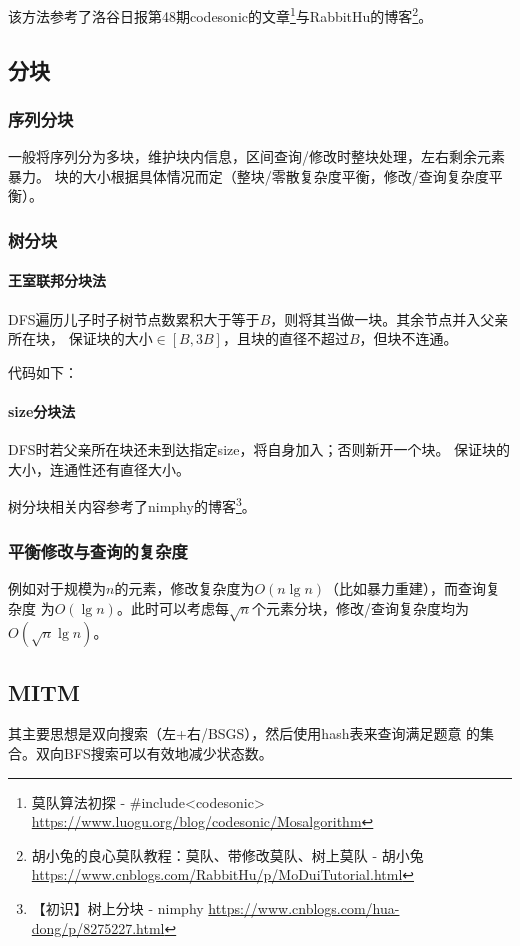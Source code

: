 该方法参考了洛谷日报第48期codesonic的文章\footnote{
	莫队算法初探 - \#include<codesonic>\\
	\url{https://www.luogu.org/blog/codesonic/Mosalgorithm}
}与RabbitHu的博客\footnote{
	胡小兔的良心莫队教程：莫队、带修改莫队、树上莫队 - 胡小兔
	\url{https://www.cnblogs.com/RabbitHu/p/MoDuiTutorial.html}
}。
\subsection{分块}\label{dividing}
\subsubsection{序列分块}
一般将序列分为多块，维护块内信息，区间查询/修改时整块处理，左右剩余元素暴力。
块的大小根据具体情况而定（整块/零散复杂度平衡，修改/查询复杂度平衡）。
\subsubsection{树分块}
\paragraph{王室联邦分块法}
DFS遍历儿子时子树节点数累积大于等于$B$，则将其当做一块。其余节点并入父亲所在块，
保证块的大小$\in [B,3B]$，且块的直径不超过$B$，但块不连通。

代码如下：

\paragraph{size分块法}
DFS时若父亲所在块还未到达指定size，将自身加入；否则新开一个块。
保证块的大小，连通性还有直径大小。

树分块相关内容参考了nimphy的博客\footnote{
	【初识】树上分块 - nimphy
	\url{https://www.cnblogs.com/hua-dong/p/8275227.html}
}。
\subsubsection{平衡修改与查询的复杂度}
例如对于规模为$n$的元素，修改复杂度为$O(n\lg n)$（比如暴力重建），而查询复杂度
为$O(\lg n)$。此时可以考虑每$\sqrt{n}$个元素分块，修改/查询复杂度均为
$O(\sqrt{n}\lg n)$。
\subsection{MITM}
其主要思想是双向搜索（左+右/BSGS），然后使用hash表来查询满足题意
的集合。双向BFS搜索可以有效地减少状态数。

